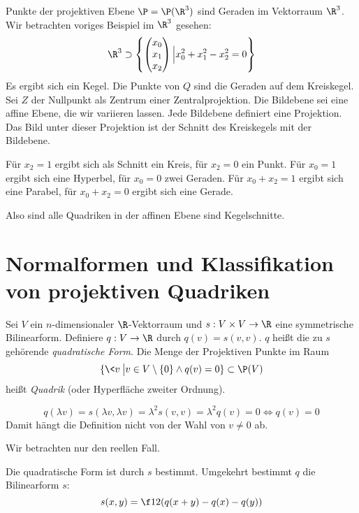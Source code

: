 \documentclass[a4paper, 10pt]{scrbook}
\begin{document}
\begin{ex}
	Punkte der projektiven Ebene $\P=\P(\R^3)$ sind Geraden im Vektorraum $\R^3$.
	Wir betrachten voriges Beispiel im $\R^3$ gesehen:
	\[
		\R^3 \supset \left\{\begin{pmatrix}x_0\\x_1\\x_2\end{pmatrix}\Big| x_0^2+x_1^2-x_2^2=0\right\}
	\]
	Es ergibt sich ein Kegel.
	\fixme[Zeichnung]
	Die Punkte von $Q$ sind die Geraden auf dem Kreiskegel.
	Sei $Z$ der Nullpunkt als Zentrum einer Zentralprojektion.
	Die Bildebene sei eine affine Ebene, die wir variieren lassen.
	Jede Bildebene definiert eine Projektion.
	Das Bild unter dieser Projektion ist der Schnitt des Kreiskegels mit der Bildebene.
	
	Für $x_2=1$ ergibt sich als Schnitt ein Kreis, für $x_2=0$ ein Punkt.
	Für $x_0=1$ ergibt sich eine Hyperbel, für $x_0=0$ zwei Geraden.
	Für $x_0+x_2=1$ ergibt sich eine Parabel, für $x_0+x_2=0$ ergibt sich eine Gerade.

	Also sind alle Quadriken in der affinen Ebene sind Kegelschnitte.
\end{ex}


\section{Normalformen und Klassifikation von projektiven Quadriken}

\begin{df}
	\label{df:15.7}
	Sei $V$ ein $n$-dimensionaler $\R$-Vektorraum und $s:V\times V\to \R$ eine symmetrische Bilinearform.
	Definiere $q:V\to \R$ durch $q(v) = s(v,v)$.
	$q$ heißt die zu $s$ gehörende \emph{quadratische Form}.
	Die Menge der Projektiven Punkte im Raum
	\[
		\{ \<v\> \big| v\in V\setminus\{0\} \land q(v) = 0\} \subset \P(V)
	\]
	heißt \emph{Quadrik} (oder Hyperfläche zweiter Ordnung).
	\begin{note}
		\[
			q(\lambda v) = s(\lambda v, \lambda v) = \lambda^2 s(v,v) = \lambda^2 q(v) = 0 \iff q(v)=0
		\]
		Damit hängt die Definition nicht von der Wahl von $v\neq 0$ ab.

		Wir betrachten nur den reellen Fall.

		Die quadratische Form ist durch $s$ bestimmt.
		Umgekehrt bestimmt $q$ die Bilinearform $s$:
		\[
			s(x,y) = \f 12 (q(x+y) - q(x) -q(y))
		\]
	\end{note}
\end{df}
\end{document}
